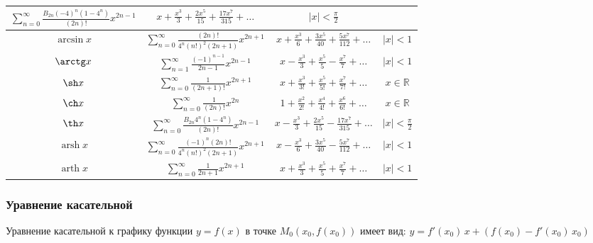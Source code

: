 \begin{tabu}[t]{||c|c|c|c||}
		$\displaystyle \sum_{n=0}^{\infty} \frac{B_{2n}(-4)^n(1-4^n)}{(2n)!} x^{2n-1} $ & 
		$\displaystyle x + \frac{x^3}{3} + \frac{2x^5}{15} + \frac{17x^7}{315} + \ldots $ & 
		$\displaystyle |x| < \frac{\pi}{2} $ \\
	\hline
		$\displaystyle \arcsin x $ & 
		$\displaystyle \sum^{\infty}_{n=0} \frac{(2n)!}{4^n (n!)^2 (2n+1)} x^{2n+1} $ & 
		$\displaystyle x + \frac{x^3}{6} + \frac{3x^5}{40} + \frac{5x^7}{112} + \ldots $ & 
		$\displaystyle |x| < 1 $ \\
	\hline
		$\displaystyle \arctg x $ & 
		$\displaystyle \sum^{\infty}_{n=1} \frac{(-1)^{n-1}}{2n-1} x^{2n-1} $ & 
		$\displaystyle x - \frac{x^3}{3} + \frac{x^5}{5} - \frac{x^7}{7} + \ldots $ & 
		$\displaystyle |x| < 1 $ \\
	\hline
		$\displaystyle \sh x $ & 
		$\displaystyle \sum^{\infty}_{n=0} \frac{1}{(2n+1)!} x^{2n+1} $ & 
		$\displaystyle x + \frac{x^3}{3!} + \frac{x^5}{5!} + \frac{x^7}{7!} + \ldots $ & 
		$\displaystyle x\in\mathbb{R} $ \\
	\hline
		$\displaystyle \ch x $ & 
		$\displaystyle \sum^{\infty}_{n=0} \frac{1}{(2n)!} x^{2n} $ & 
		$\displaystyle 1 + \frac{x^2}{2!} + \frac{x^4}{4!} + \frac{x^6}{6!} + \ldots $ & 
		$\displaystyle x\in\mathbb{R} $ \\
	\hline
		$\displaystyle \th x $ & 
		$\displaystyle \sum_{n=0}^{\infty} \frac{B_{2n}4^n(1-4^n)}{(2n)!} x^{2n-1} $ & 
		$\displaystyle x - \frac{x^3}{3} + \frac{2x^5}{15} - \frac{17x^7}{315} + \ldots $ & 
		$\displaystyle |x| < \frac{\pi}{2} $ \\
	\hline
		$\displaystyle \operatorname{arsh} x $ & 
		$\displaystyle \sum^{\infty}_{n=0} \frac{(-1)^n (2n)!}{4^n (n!)^2 (2n+1)} x^{2n+1} $ & 
		$\displaystyle x - \frac{x^3}{6} + \frac{3x^5}{40} - \frac{5x^7}{112} + \ldots $ & 
		$\displaystyle |x| < 1 $ \\
	\hline
		$\displaystyle \operatorname{arth} x $ & 
		$\displaystyle \sum^{\infty}_{n=0} \frac{1}{2n + 1} x^{2n+1} $ & 
		$\displaystyle x + \frac{x^3}{3} + \frac{x^5}{5} + \frac{x^7}{7} + \ldots $ & 
		$\displaystyle |x| < 1 $ \\
	\hline
\end{tabu}

\subsubsection{Уравнение касательной}

Уравнение касательной к графику функции $\displaystyle y = f(x) $ в точке $\displaystyle M_0(x_0, f(x_0)) $ имеет вид:
$ y = f'(x_0)\, x + (f(x_0) - f'(x_0)\, x_0) $

